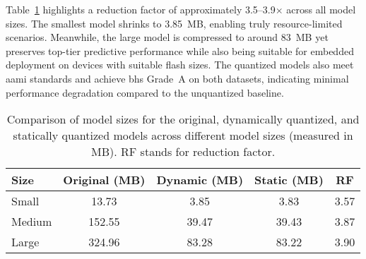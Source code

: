 Table~\ref{tab:model_size_comparison} highlights a reduction factor of approximately 3.5--3.9$\times$ across all model sizes. The smallest model shrinks to 3.85~MB, enabling truly resource-limited scenarios. Meanwhile, the large model is compressed to around 83~MB yet preserves top-tier predictive performance while also being suitable for embedded deployment on devices with suitable flash sizes. The quantized models also meet \gls{aami} standards and achieve \gls{bhs} Grade~A on both datasets, indicating minimal performance degradation compared to the unquantized baseline.


\begin{table}[b]
\centering
\vspace{-0.5cm}
\caption{Dynamic and Static Quantization test $R^2$ versus original test $R^2$ for DBP and SBP on the 200 epoch models}
\label{tab:quantization_r2}
\renewcommand{\arraystretch}{1.2} 
\setlength{\tabcolsep}{2pt} 
\end{table}

\begin{table}[ht!]
\centering
\caption{Comparison of model sizes for the original, dynamically quantized, and statically quantized models across different model sizes (measured in MB). RF stands for reduction factor.}
\label{tab:model_size_comparison}
\begin{tabular}{lcccc}
\toprule
\textbf{Size} & \textbf{Original (MB)} & \textbf{Dynamic (MB)} & \textbf{Static (MB)} & \textbf{RF} \\
\midrule
Small & 13.73 & 3.85 & 3.83 & 3.57 \\
Medium & 152.55 & 39.47 & 39.43 & 3.87 \\
Large & 324.96 & 83.28 & 83.22 & 3.90 \\
\bottomrule
\end{tabular}

\vspace{-0.5cm}
\end{table}

